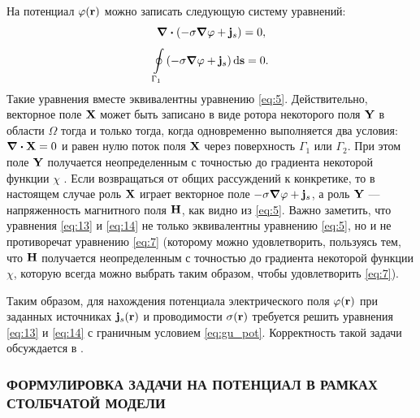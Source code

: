 На потенциал $\varphi(\vb{r})$ можно записать следующую систему уравнений:
\begin{equation}
    \div{\qty(- \sigma \grad{\varphi} + \vb{j}_s)} = 0,
    \label{eq:13}
\end{equation}
\begin{equation}
    \oint\limits_{\Gamma_1} \qty(- \sigma \grad{\varphi} + \vb{j}_s) \dd{\vb{s}} = 0.
    \label{eq:14}
\end{equation}
Такие уравнения вместе эквивалентны уравнению \eqref{eq:5}. Действительно, векторное поле $\vb{X}$ может быть записано в виде ротора некоторого поля $\vb{Y}$ в области $\Omega$ тогда и только тогда, когда одновременно выполняется два условия: $\div{\vb{X}} = 0$ и равен нулю поток поля $\vb{X}$ через поверхность $\Gamma_1$ или $\Gamma_2$. При этом поле $\vb{Y}$ получается неопределенным с точностью до градиента некоторой функции $\chi$%
. Если возвращаться от общих рассуждений к конкретике, то в настоящем случае роль $\vb{X}$ играет векторное поле $- \sigma \grad{\varphi} + \vb{j}_s$, а роль $\vb{Y}$ --- напряженность магнитного поля $\vb{H}$, как видно из \eqref{eq:5}. Важно заметить, что уравнения \eqref{eq:13} и \eqref{eq:14} не только эквивалентны уравнению \eqref{eq:5}, но и не противоречат уравнению \eqref{eq:7} (которому можно удовлетворить, пользуясь тем, что $\vb{H}$ получается неопределенным с точностью до градиента некоторой функции $\chi$, которую всегда можно выбрать таким образом, чтобы удовлетворить \eqref{eq:7}).

Таким образом, для нахождения потенциала электрического поля $\varphi(\vb{r})$ при заданных источниках $\vb{j}_s(\vb{r})$ и проводимости $\sigma(\vb{r})$ требуется решить уравнения \eqref{eq:13} и \eqref{eq:14} с граничным условием \eqref{eq:gu_pot}. Корректность такой задачи обсуждается в \cite{Kalinin_et_al_2014}.

\subsubsection{ФОРМУЛИРОВКА ЗАДАЧИ НА ПОТЕНЦИАЛ В РАМКАХ СТОЛБЧАТОЙ МОДЕЛИ}
\label{sec:stolb}

